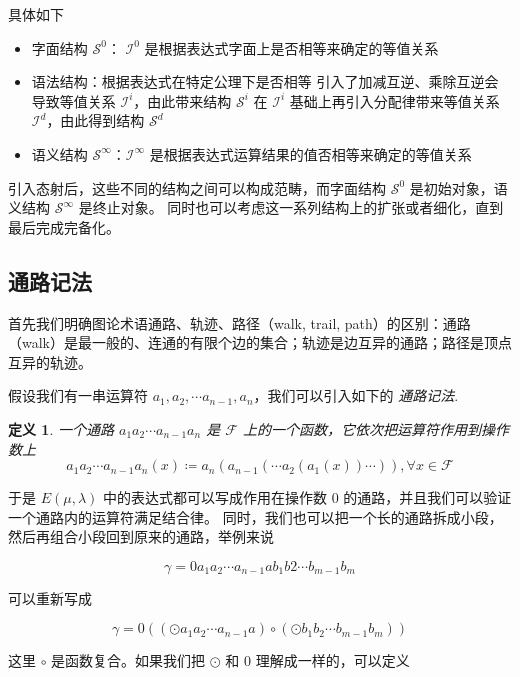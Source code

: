 \documentclass[a4paper,12pt]{article}
\newtheorem{definition}{定义}
\numberwithin{definition}{section}
\numberwithin{lemma}{section}
\numberwithin{proposition}{section}
\numberwithin{theorem}{section}
\numberwithin{grammar}{section}
\numberwithin{program}{section}
\numberwithin{convention}{section}
\numberwithin{corollary}{section}
\begin{document}
具体如下

\begin{itemize}
    \item 字面结构 $\mathcal{S}^0$： $\mathcal{I}^0$ 是根据表达式字面上是否相等来确定的等值关系
    \item 语法结构：根据表达式在特定公理下是否相等
        \subitem 引入了加减互逆、乘除互逆会导致等值关系 $\mathcal{I}^i$，由此带来结构 $\mathcal{S}^i$
        \subitem 在 $\mathcal{I}^i$ 基础上再引入分配律带来等值关系 $\mathcal{I}^d$，由此得到结构 $\mathcal{S}^d$
    \item 语义结构 $\mathcal{S}^\infty$：$\mathcal{I}^\infty$ 是根据表达式运算结果的值否相等来确定的等值关系
\end{itemize}

引入态射后，这些不同的结构之间可以构成范畴，而字面结构 $\mathcal{S}^0$ 是初始对象，语义结构 $\mathcal{S}^\infty$ 是终止对象。
同时也可以考虑这一系列结构上的扩张或者细化，直到最后完成完备化。

\subsection{通路记法}\label{subsec:walknotion}

首先我们明确图论术语通路、轨迹、路径（walk, trail, path）的区别：通路（walk）是最一般的、连通的有限个边的集合；轨迹是边互异的通路；路径是顶点互异的轨迹。

假设我们有一串运算符 $a_1, a_2, \cdots a_{n-1}, a_n$，我们可以引入如下的 \emph{通路记法}.

\begin{definition}
\label{definition:path}
    一个通路 $a_1 a_2 \cdots a_{n-1} a_n$ 是 $\mathcal{F}$ 上的一个函数，它依次把运算符作用到操作数上
    $$a_1 a_2 \cdots a_{n-1} a_n (x) \coloneqq a_n( a_{n-1}( \cdots a_2( a_1(x) ) \cdots ) ), \forall x \in \mathcal{F}$$
\end{definition}

于是 $E(\mu, \lambda)$ 中的表达式都可以写成作用在操作数 $0$ 的通路，并且我们可以验证一个通路内的运算符满足结合律。
同时，我们也可以把一个长的通路拆成小段，然后再组合小段回到原来的通路，举例来说

$$\gamma = 0 a_1 a_2 \cdots a_{n-1} a b_1 b2 \cdots b_{m-1} b_m$$

可以重新写成

$$\gamma = 0 ((\odot a_1 a_2 \cdots a_{n-1} a) \circ (\odot b_1 b_2 \cdots b_{m-1} b_m))$$

这里 $\circ$ 是函数复合。如果我们把 $\odot$ 和 $0$ 理解成一样的，可以定义
\end{document}
